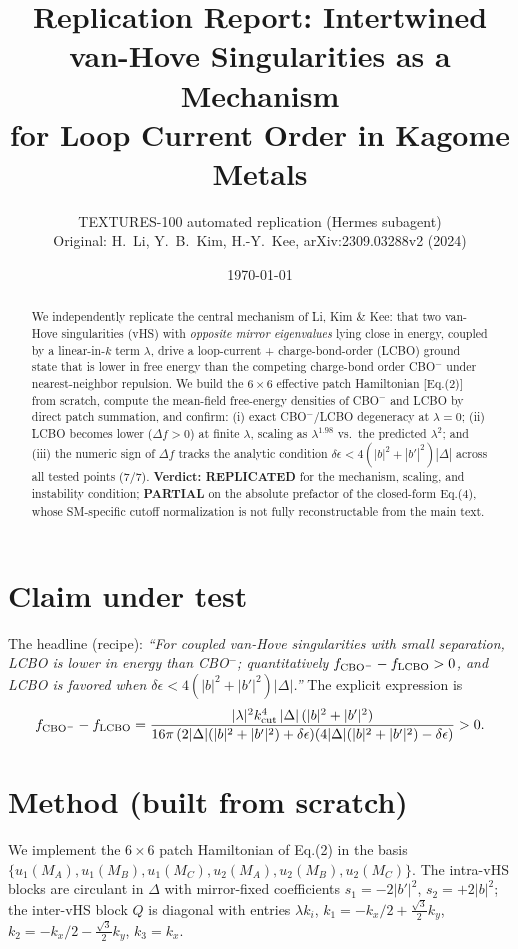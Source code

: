 \documentclass[11pt]{article}
\title{Replication Report: Intertwined van-Hove Singularities as a Mechanism\\
for Loop Current Order in Kagome Metals}
\author{TEXTURES-100 automated replication (Hermes subagent)\\
Original: H.~Li, Y.~B.~Kim, H.-Y.~Kee, arXiv:2309.03288v2 (2024)}
\date{\today}
\begin{document}
\maketitle

\begin{abstract}
We independently replicate the central mechanism of Li, Kim \& Kee: that two
van-Hove singularities (vHS) with \emph{opposite mirror eigenvalues} lying close
in energy, coupled by a linear-in-$k$ term $\lambda$, drive a loop-current +
charge-bond-order (LCBO) ground state that is lower in free energy than the
competing charge-bond order CBO$^-$ under nearest-neighbor repulsion. We build
the $6\times6$ effective patch Hamiltonian [Eq.(2)] from scratch, compute the
mean-field free-energy densities of CBO$^-$ and LCBO by direct patch summation,
and confirm: (i) exact CBO$^-$/LCBO degeneracy at $\lambda=0$; (ii) LCBO becomes
lower ($\Delta f>0$) at finite $\lambda$, scaling as $\lambda^{1.98}$ vs.\ the
predicted $\lambda^2$; and (iii) the numeric sign of $\Delta f$ tracks the
analytic condition $\delta\epsilon < 4(|b|^2+|b'|^2)|\Delta|$ across all tested
points ($7/7$). \textbf{Verdict: REPLICATED} for the mechanism, scaling, and
instability condition; \textbf{PARTIAL} on the absolute prefactor of the
closed-form Eq.(4), whose SM-specific cutoff normalization is not fully
reconstructable from the main text.
\end{abstract}

\section{Claim under test}
The headline (recipe): \emph{``For coupled van-Hove singularities with small
separation, LCBO is lower in energy than CBO$^-$; quantitatively $f_{\rm CBO^-} -
f_{\rm LCBO} > 0$, and LCBO is favored when $\delta\epsilon <
4(|b|^2+|b'|^2)|\Delta|$.''} The explicit expression is
\begin{equation}
f_{\rm CBO^-}-f_{\rm LCBO}
= \frac{|\lambda|^2 k_{\rm cut}^4\,|\Delta|\,(|b|^2+|b'|^2)}
{16\pi\,(2|\Delta|(|b|^2+|b'|^2)+\delta\epsilon)(4|\Delta|(|b|^2+|b'|^2)-\delta\epsilon)}>0.
\label{eq:eq4}
\end{equation}

\section{Method (built from scratch)}
We implement the $6\times6$ patch Hamiltonian of Eq.(2) in the basis
$\{u_1(M_A),u_1(M_B),u_1(M_C),u_2(M_A),u_2(M_B),u_2(M_C)\}$. The intra-vHS blocks
are circulant in $\Delta$ with mirror-fixed coefficients $s_1=-2|b'|^2$,
$s_2=+2|b|^2$; the inter-vHS block $Q$ is diagonal with entries $\lambda k_i$,
$k_1=-k_x/2+\tfrac{\sqrt3}{2}k_y$, $k_2=-k_x/2-\tfrac{\sqrt3}{2}k_y$, $k_3=k_x$.
\end{document}
